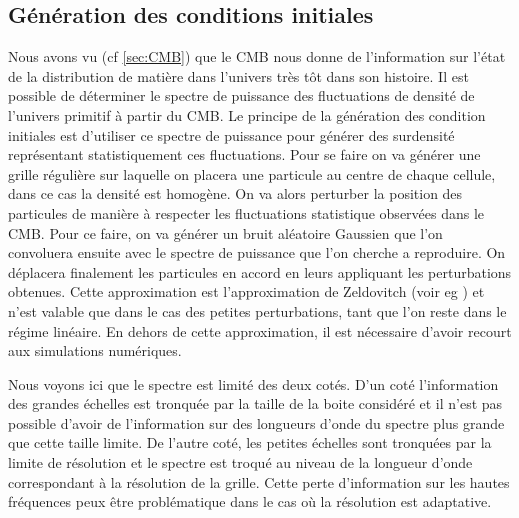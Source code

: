 \subsection{Génération des conditions initiales}
\label{sec:IC}

Nous avons vu (cf \ref{sec:CMB}) que le \ac{CMB} nous donne de l'information sur l'état de la distribution de matière dans l'univers très tôt dans son histoire.
Il est possible de déterminer le spectre de puissance des fluctuations de densité de l'univers primitif à partir du \ac{CMB}.
Le principe de la génération des condition initiales est d'utiliser ce spectre de puissance pour générer des surdensité représentant statistiquement ces fluctuations.
Pour se faire on va générer une grille régulière sur laquelle on placera une particule au centre de chaque cellule, dans ce cas la densité est homogène.
On va alors perturber la position des particules de manière à respecter les fluctuations statistique observées dans le \ac{CMB}.
Pour ce faire, on va générer un bruit aléatoire Gaussien que l'on 
convoluera ensuite avec le spectre de puissance que l'on cherche a reproduire.
On déplacera finalement les particules en accord en leurs appliquant les perturbations obtenues. 
Cette approximation est l’approximation de Zeldovitch (voir eg \cite{2014MNRAS.439.3630W}) et n'est valable que dans le cas des petites perturbations, tant que l'on reste dans le régime linéaire.
En dehors de cette approximation, il est nécessaire d'avoir recourt aux simulations numériques.

Nous voyons ici que le spectre est limité des deux cotés.
D'un coté l'information des grandes échelles est tronquée par la taille de la boite considéré et il n'est pas possible d'avoir de l’information sur des longueurs d'onde du spectre plus grande que cette taille limite.
De l'autre coté, les petites échelles sont tronquées par la limite de résolution et le spectre est troqué au niveau de la longueur d'onde correspondant à la résolution de la grille.
Cette perte d'information sur les hautes fréquences peux être problématique dans le cas où la résolution est adaptative.

